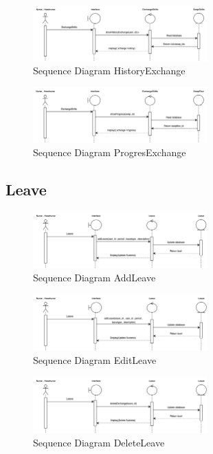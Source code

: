     \begin{figure}[h]
        \centering
        \includegraphics[width=0.6\textwidth]{Sequence 6.4.png}
        \caption{Sequence Diagram HistoryExchange}
        \end{figure}
    
        \begin{figure}[h]
            \centering
            \includegraphics[width=0.6\textwidth]{Sequence 6.5.png}
            \caption{Sequence Diagram ProgresExchange}
            \end{figure}

\subsection{Leave}

\begin{figure}[h]
    \centering
    \includegraphics[width=0.6\textwidth]{Sequence 7.1.png}
    \caption{Sequence Diagram AddLeave}
    \end{figure}

    \begin{figure}[h]
    \centering
    \includegraphics[width=0.6\textwidth]{Sequence 7.2.png}
    \caption{Sequence Diagram EditLeave}
    \end{figure}

    \begin{figure}[h]
    \centering
    \includegraphics[width=0.6\textwidth]{Sequence 7.3.png}
    \caption{Sequence Diagram DeleteLeave}
    \end{figure}

